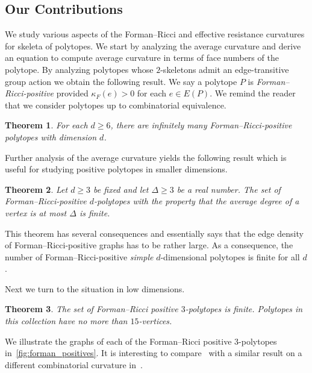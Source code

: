 \documentclass[11pt,a4paper]{amsart}
\newcommand{\forman}[1]{\kappa_F\left({#1}\right)}
\newtheorem{theorem}{Theorem}[section]
\begin{document}
\subsection{Our Contributions}

We study various aspects of the Forman--Ricci and effective resistance curvatures for skeleta of polytopes. We start by analyzing the average curvature and derive an equation to compute average curvature in terms of face numbers of the polytope. By analyzing polytopes whose $2$-skeletons admit an edge-transitive group action we obtain the following result. We say a polytope $P$ is \emph{Forman--Ricci-positive} provided $\forman{e} > 0$ for each $e\in E(P)$. We remind the reader that we consider polytopes up to combinatorial equivalence. 

\begin{theorem}\label{thm:FormanInfinite6}
    For each $d\geq 6$, there are infinitely many Forman--Ricci-positive polytopes with dimension $d$.
\end{theorem}

Further analysis of the average curvature yields the following result which is useful for studying positive polytopes in smaller dimensions. 

\begin{theorem}\label{thm: boundedDeg}
    Let $d\geq 3$ be fixed and let $\Delta\ge 3$ be a real number. The set of Forman--Ricci-positive $d$-polytopes with the property that the average degree of a vertex is at most $\Delta$ is finite. 
\end{theorem}

This theorem has several consequences and essentially says that the edge density of Forman--Ricci-positive graphs has to be rather large. As a consequence, the number of Forman--Ricci-positive \emph{simple} $d$-dimensional polytopes is finite for all $d$. 

Next we turn to the situation in low dimensions.

\begin{theorem}\label{thm:FormanFinite3}
    The set of Forman--Ricci positive $3$-polytopes is finite. Polytopes in this collection have no more than $15$-vertices. 
\end{theorem}

We illustrate the graphs of each of the Forman--Ricci positive 3-polytopes in~\cref{fig:forman_positives}. It is interesting to compare~ with a similar result on a different combinatorial curvature in~\cite{DevosMohar2007}.
\end{document}
